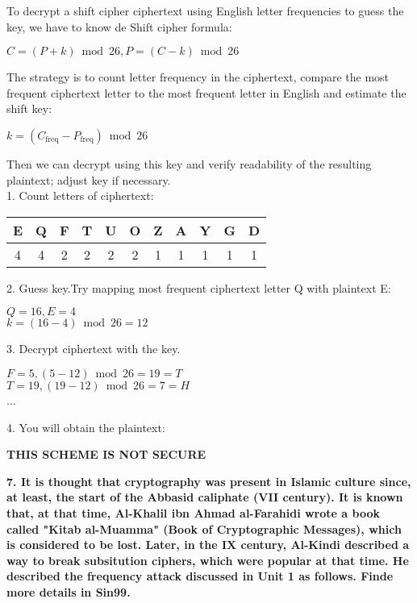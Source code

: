 \documentclass[]{article}
\numberwithin{figure}{section}
\begin{document}
\medskip

\noindent
To decrypt a shift cipher ciphertext using English letter frequencies to guess the key, we have to know de Shift cipher formula:\\
\begin{center}
	$C = (P + k) \bmod 26, P = (C - k) \bmod 26$
\end{center}
The strategy is to count letter frequency in the ciphertext, compare the most frequent ciphertext letter to the most frequent letter in English and estimate the shift key:\\
\begin{center}
	$k = (C_{\text{freq}} - P_{\text{freq}}) \bmod 26$
\end{center}
Then we can decrypt using this key and verify readability of the resulting plaintext; adjust key if necessary. \\

1. Count letters of ciphertext:
\begin{center}
	\begin{tabular}{|c|c|c|c|c|c|c|c|c|c|c|}
		\hline
		E & Q & F & T & U & O & Z & A & Y & G & D \\
		\hline
		4 & 4 & 2 & 2 & 2 & 2 & 1 & 1 & 1 & 1 & 1 \\
		\hline
	\end{tabular}
\end{center}

2. Guess key.Try mapping most frequent ciphertext letter Q with plaintext E:
\begin{center}
	$Q = 16, E = 4$ \\
	$k = (16 - 4) \bmod 26 = 12$
\end{center}

3. Decrypt ciphertext with the key.
\begin{center}
	$F = 5, (5 - 12) \bmod 26 = 19 = T$ \\
	$T = 19, (19 - 12) \bmod 26 = 7 = H$ \\
	...
\end{center}

4. You will obtain the plaintext: 
\begin{center}
	\textbf{THIS SCHEME IS NOT SECURE}
\end{center}
\newpage
\bigskip
\noindent
\textbf{7. It is thought that cryptography was present in Islamic culture since, at least, the start of the Abbasid caliphate (VII century). It is known that, at that time, Al-Khalil ibn Ahmad al-Farahidi wrote a book called "Kitab al-Muamma" (Book of Cryptographic Messages), which is considered to be lost. Later, in the IX century, Al-Kindi described a way to break subsitution ciphers, which were popular at that time. He described the frequency attack discussed in Unit 1 as follows. Finde more details in Sin99.} 
\end{document}

